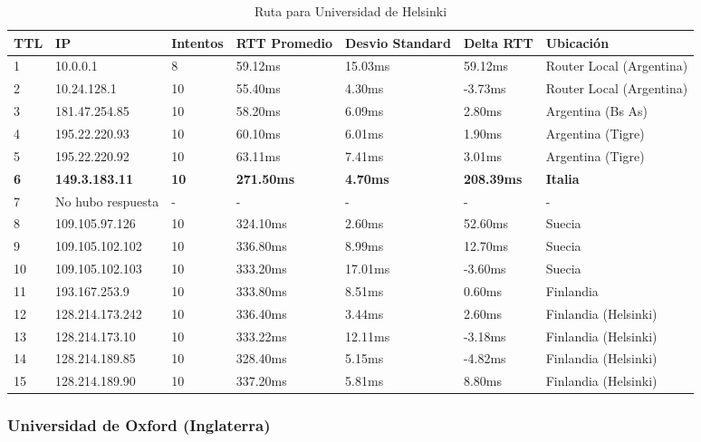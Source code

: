 \begin{table}[H]
	\centering
	\caption{Ruta para Universidad de Helsinki}
	\label{table:finlandia}
	\begin{tabular}{|l|l|l|l|l|l|l|}
		\hline
		TTL & IP & Intentos & RTT Promedio & Desvio Standard & Delta RTT & Ubicación \\ \hline 
		1 & 10.0.0.1 & 8 & 59.12ms & 15.03ms & 59.12ms & Router Local (Argentina) \\ \hline 
		2 & 10.24.128.1 & 10 & 55.40ms & 4.30ms & -3.73ms & Router Local (Argentina) \\ \hline 
		3 & 181.47.254.85 & 10 & 58.20ms & 6.09ms & 2.80ms & Argentina (Bs As) \\ \hline 
		4 & 195.22.220.93 & 10 & 60.10ms & 6.01ms & 1.90ms & Argentina (Tigre) \\ \hline 
		5 & 195.22.220.92 & 10 & 63.11ms & 7.41ms & 3.01ms & Argentina (Tigre) \\ \hline 
		\textbf{6} & \textbf{149.3.183.11} & \textbf{10} & \textbf{271.50ms} & \textbf{4.70ms} & \textbf{208.39ms} & \textbf{Italia} \\ \hline 
		7 & No hubo respuesta & - & - & - & - & - \\ \hline 
		8 & 109.105.97.126 & 10 & 324.10ms & 2.60ms & 52.60ms & Suecia \\ \hline 
		9 & 109.105.102.102 & 10 & 336.80ms & 8.99ms & 12.70ms & Suecia \\ \hline 
		10 & 109.105.102.103 & 10 & 333.20ms & 17.01ms & -3.60ms& Suecia \\ \hline 
		11 & 193.167.253.9 & 10 & 333.80ms & 8.51ms & 0.60ms & Finlandia \\ \hline 
		12 & 128.214.173.242 & 10 & 336.40ms & 3.44ms & 2.60ms & Finlandia (Helsinki) \\ \hline 
		13 & 128.214.173.10 & 10 & 333.22ms & 12.11ms & -3.18ms & Finlandia (Helsinki) \\ \hline 
		14 & 128.214.189.85 & 10 & 328.40ms & 5.15ms & -4.82ms & Finlandia (Helsinki) \\ \hline 
		15 & 128.214.189.90 & 10 & 337.20ms & 5.81ms & 8.80ms & Finlandia (Helsinki) \\ \hline
	\end{tabular}
\end{table}

\subsubsection{Universidad de Oxford (Inglaterra)}

